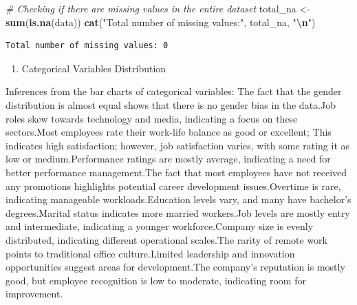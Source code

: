 \documentclass[
  10pt,
  paper=a4,
  ,captions=tableheading
]{scrartcl}
\newenvironment{Shaded}{\begin{snugshade}}{\end{snugshade}}
\newcommand{\CommentTok}[1]{\textcolor[rgb]{0.56,0.35,0.01}{\textit{#1}}}
\newcommand{\FunctionTok}[1]{\textcolor[rgb]{0.13,0.29,0.53}{\textbf{#1}}}
\newcommand{\NormalTok}[1]{#1}
\newcommand{\OtherTok}[1]{\textcolor[rgb]{0.56,0.35,0.01}{#1}}
\newcommand{\SpecialCharTok}[1]{\textcolor[rgb]{0.81,0.36,0.00}{\textbf{#1}}}
\newcommand{\StringTok}[1]{\textcolor[rgb]{0.31,0.60,0.02}{#1}}
\providecommand{\tightlist}{%
  \setlength{\itemsep}{0pt}\setlength{\parskip}{0pt}}
\begin{document}
\small

\begin{Shaded}
\begin{Highlighting}[]
\CommentTok{\# Checking if there are missing values in the entire dataset}
\NormalTok{total\_na }\OtherTok{\textless{}{-}} \FunctionTok{sum}\NormalTok{(}\FunctionTok{is.na}\NormalTok{(data))}
\FunctionTok{cat}\NormalTok{(}\StringTok{"Total number of missing values:"}\NormalTok{, total\_na, }\StringTok{"}\SpecialCharTok{\textbackslash{}n}\StringTok{"}\NormalTok{)}
\end{Highlighting}
\end{Shaded}

\begin{verbatim}
Total number of missing values: 0 
\end{verbatim}

\small

\begin{enumerate}
\def\labelenumi{\arabic{enumi}.}
\setcounter{enumi}{3}
\tightlist
\item
  Categorical Variables Distribution
\end{enumerate}

Inferences from the bar charts of categorical variables: The fact that
the gender distribution is almost equal shows that there is no gender
bias in the data.Job roles skew towards technology and media, indicating
a focus on these sectors.Most employees rate their work-life balance as
good or excellent; This indicates high satisfaction; however, job
satisfaction varies, with some rating it as low or medium.Performance
ratings are mostly average, indicating a need for better performance
management.The fact that most employees have not received any promotions
highlights potential career development issues.Overtime is rare,
indicating manageable workloads.Education levels vary, and many have
bachelor's degrees.Marital status indicates more married workers.Job
levels are mostly entry and intermediate, indicating a younger
workforce.Company size is evenly distributed, indicating different
operational scales.The rarity of remote work points to traditional
office culture.Limited leadership and innovation opportunities suggest
areas for development.The company's reputation is mostly good, but
employee recognition is low to moderate, indicating room for
improvement.

\small
\end{document}
